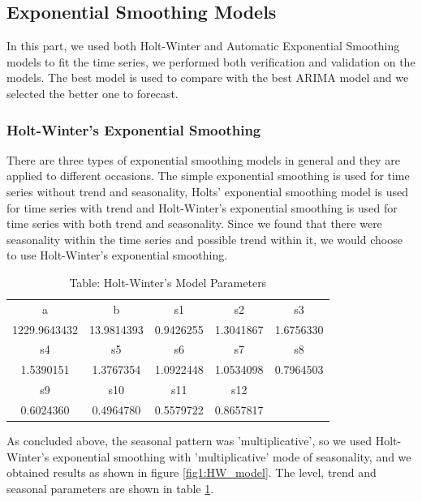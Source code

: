 \documentclass[journal, a4paper]{IEEEtran}
\begin{document}
\subsection{Exponential Smoothing Models}
In this part, we used both Holt-Winter and Automatic Exponential Smoothing models to fit the time series, we performed both verification and validation on the models. The best model is used to compare with the best ARIMA model and we selected the better one to forecast.

\subsubsection{Holt-Winter's Exponential Smoothing}
There are three types of exponential smoothing models in general and they are applied to different occasions. The simple exponential smoothing is used for time series without trend and seasonality, Holts' exponential smoothing model is used for time series with trend and Holt-Winter's exponential smoothing is used for time series with both trend and seasonality.  Since we found that there were seasonality within the time series and possible trend within it, we would choose to use Holt-Winter's exponential smoothing. 
\begin{table}[H]
\caption{Table: Holt-Winter's Model Parameters}
\label{table:HW}
\centering
\begin{tabular}{|c|c|c|c|c|}
\hline
a & b & s1 & s2 & s3 \\ 
1229.9643432    & 13.9814393     & 0.9426255     & 1.3041867     & 1.6756330     \\ \hline
s4 & s5 & s6 & s7 & s8 \\ 
1.5390151   & 1.3767354    &  1.0922448    &  1.0534098    &  0.7964503    \\ \hline
s9 & s10 & s11 & s12 & ~ \\  
 0.6024360     & 0.4964780   &    0.5579722    &  0.8657817   & ~ \\
\hline
\end{tabular}
\end{table}
As concluded above, the seasonal pattern was 'multiplicative', so we used Holt-Winter's exponential smoothing with 'multiplicative' mode of seasonality, and we obtained results as shown in figure \ref{fig1:HW_model}. The level, trend and seasonal parameters are shown in table \ref{table:HW}.
\end{document}
